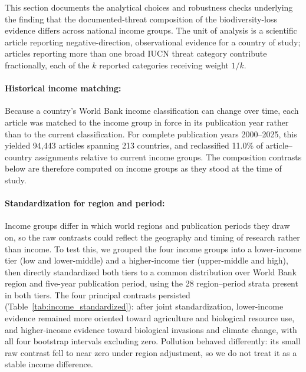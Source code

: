 \documentclass[12pt]{article}
\begin{document}
This section documents the analytical choices and robustness checks underlying the finding that the documented-threat composition of the biodiversity-loss evidence differs across national income groups. The unit of analysis is a scientific article reporting negative-direction, observational evidence for a country of study; articles reporting more than one broad IUCN threat category contribute fractionally, each of the $k$ reported categories receiving weight $1/k$.

\paragraph*{Historical income matching:} Because a country's World Bank income classification can change over time, each article was matched to the income group in force in its publication year rather than to the current classification. For complete publication years 2000--2025, this yielded 94{,}443 articles spanning 213 countries, and reclassified 11.0\% of article--country assignments relative to current income groups. The composition contrasts below are therefore computed on income groups as they stood at the time of study.

\paragraph*{Standardization for region and period:} Income groups differ in which world regions and publication periods they draw on, so the raw contrasts could reflect the geography and timing of research rather than income. To test this, we grouped the four income groups into a lower-income tier (low and lower-middle) and a higher-income tier (upper-middle and high), then directly standardized both tiers to a common distribution over World Bank region and five-year publication period, using the 28 region--period strata present in both tiers. The four principal contrasts persisted (Table~\ref{tab:income_standardized}): after joint standardization, lower-income evidence remained more oriented toward agriculture and biological resource use, and higher-income evidence toward biological invasions and climate change, with all four bootstrap intervals excluding zero. Pollution behaved differently: its small raw contrast fell to near zero under region adjustment, so we do not treat it as a stable income difference.
\end{document}

